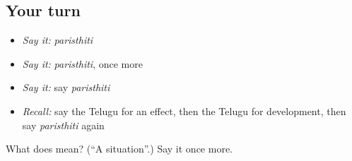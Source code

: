 \subsection*{Your turn}
\begin{itemize}
\raggedright
  \item \emph{Say it:} \emph{paristhiti}
  \item \emph{Say it:} \emph{paristhiti}, once more
  \item \emph{Say it:} say \emph{paristhiti}
  \item \emph{Recall:} say the Telugu for an effect, then the Telugu for development, then say \emph{paristhiti} again
\end{itemize}

\begin{tcolorbox}[breakable,colback=teal!4,colframe=teal!35!black,title={Before you move on}]
What does  mean? (\textquotedblleft{}A situation\textquotedblright{}.) Say it once more.
\end{tcolorbox}

